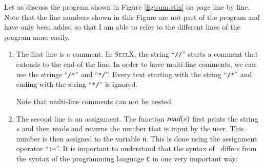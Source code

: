 Let us discuss the program shown in Figure \ref{fig:sum.stlx} on page \pageref{fig:sum.stlx} line by line.
Note that the line numbers shown in this Figure are not part of the program and have only been added
so that I am able to refer to the different lines of the program more easily.
\begin{enumerate}
\item The first line is a comment.  In \textsc{SetlX}, the string  ``\texttt{//}'' starts a comment
      that extends to the end of the line.  In order to have multi-line comments, we can use the 
      strings ``\texttt{/*}'' and ``\texttt{*/}''.  Every text starting with the string ``\texttt{/*}''
      and ending with the string ``\texttt{*/}'' is ignored.

      Note that multi-line comments can not be nested.
\item The second line is an assignment.  The function  $\textsl{read}(s)$ 
      first prints the string $s$ and then reads and returns the number that is input by the user.
      This number is then assigned to the variable \texttt{n}.  This is done using the assignment operator
      ``\texttt{:=}''.  It is important to understand that the syntax of \setl\ differs from the
      syntax of the programming language \texttt{C} in one very important way:

      \begin{center}
      \colorbox{red}{}
      \end{center}      


\end{enumerate}
